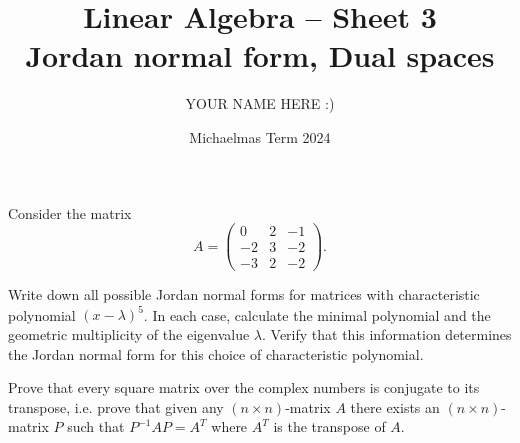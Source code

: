 \documentclass[answers]{exam}
\title{Linear Algebra -- Sheet 3\\Jordan normal form, Dual spaces}
\author{YOUR NAME HERE :)}
\date{Michaelmas Term 2024}
\begin{document}
\maketitle

\begin{questions}

\question%
Consider the matrix \[
	A=\begin{pmatrix}
		0 & 2 & -1 \\
		-2 & 3 & -2 \\
		-3 & 2 & -2
	\end{pmatrix}.
\]



\question%
Write down all possible Jordan normal forms for matrices with characteristic polynomial $(x-\lambda)^{5}$. In each case, calculate the minimal polynomial and the geometric multiplicity of the eigenvalue $\lambda$. Verify that this information determines the Jordan normal form for this choice of characteristic polynomial.



\question%
Prove that every square matrix over the complex numbers is conjugate to its transpose, i.e. prove that given any $(n \times n)$-matrix $A$ there exists an $(n \times n)$-matrix $P$ such that $P^{-1} A P=A^{T}$ where $A^{T}$ is the transpose of $A$.




\end{questions}
\end{document}
